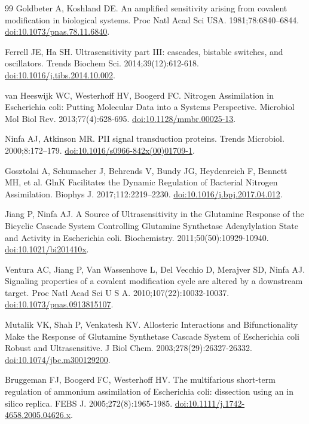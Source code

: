 \documentclass[10pt,letterpaper]{article}
\begin{document}
\begin{singlespace}
\begin{thebibliography}{99}
Goldbeter A, Koshland DE. An amplified sensitivity arising from covalent modification in biological systems. Proc Natl Acad Sci USA. 1981;78:6840--6844. \href{https://doi.org/10.1073/pnas.78.11.6840}{doi:10.1073/pnas.78.11.6840}.

Ferrell JE, Ha SH. Ultrasensitivity part III: cascades, bistable switches, and oscillators. Trends Biochem Sci. 2014;39(12):612-618. \href{https://doi.org/10.1016/j.tibs.2014.10.002}{doi:10.1016/j.tibs.2014.10.002}.

van Heeswijk WC, Westerhoff HV, Boogerd FC. Nitrogen Assimilation in Escherichia coli: Putting Molecular Data into a Systems Perspective. Microbiol Mol Biol Rev. 2013;77(4):628-695. \href{https://doi.org/10.1128/mmbr.00025-13}{doi:10.1128/mmbr.00025-13}.

Ninfa AJ, Atkinson MR. PII signal transduction proteins. Trends Microbiol. 2000;8:172--179. \href{https://doi.org/10.1016/s0966-842x(00)01709-1}{doi:10.1016/s0966-842x(00)01709-1}.

Gosztolai A, Schumacher J, Behrends V, Bundy JG, Heydenreich F, Bennett MH, et al. GlnK Facilitates the Dynamic Regulation of Bacterial Nitrogen Assimilation. Biophys J. 2017;112:2219--2230. \href{https://doi.org/10.1016/j.bpj.2017.04.012}{doi:10.1016/j.bpj.2017.04.012}.

Jiang P, Ninfa AJ. A Source of Ultrasensitivity in the Glutamine Response of the Bicyclic Cascade System Controlling Glutamine Synthetase Adenylylation State and Activity in Escherichia coli. Biochemistry. 2011;50(50):10929-10940. \href{https://doi.org/10.1021/bi201410x}{doi:10.1021/bi201410x}.

Ventura AC, Jiang P, Van Wassenhove L, Del Vecchio D, Merajver SD, Ninfa AJ. Signaling properties of a covalent modification cycle are altered by a downstream target. Proc Natl Acad Sci U S A. 2010;107(22):10032-10037. \href{https://doi.org/10.1073/pnas.0913815107}{doi:10.1073/pnas.0913815107}.

Mutalik VK, Shah P, Venkatesh KV. Allosteric Interactions and Bifunctionality Make the Response of Glutamine Synthetase Cascade System of Escherichia coli Robust and Ultrasensitive. J Biol Chem. 2003;278(29):26327-26332. \href{https://doi.org/10.1074/jbc.m300129200}{doi:10.1074/jbc.m300129200}.

Bruggeman FJ, Boogerd FC, Westerhoff HV. The multifarious short-term regulation of ammonium assimilation of Escherichia coli: dissection using an in silico replica. FEBS J. 2005;272(8):1965-1985. \href{https://doi.org/10.1111/j.1742-4658.2005.04626.x}{doi:10.1111/j.1742-4658.2005.04626.x}.


\end{thebibliography}
\end{singlespace}
\end{document}
